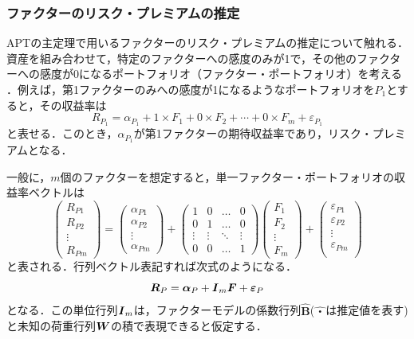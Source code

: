 ﻿\documentclass[a4paper]{jarticle}
\begin{document}
\subsubsection{ファクターのリスク・プレミアムの推定}
APTの主定理で用いるファクターのリスク・プレミアムの推定について触れる．
資産を組み合わせて，特定のファクターへの感度のみが1で，その他のファクターへの感度が0になるポートフォリオ（ファクター・ポートフォリオ）を考える ．例えば，第1ファクターのみへの感度が1になるようなポートフォリオを$P_1$とすると，その収益率は
\begin{equation}
R_{P_1} = \alpha_{P_1} + 1\times F_1 + 0\times F_2 + \cdots + 0\times F_m + \varepsilon_{P_1} 
\end{equation}
と表せる．このとき，$\alpha_{P_1}$が第1ファクターの期待収益率であり，リスク・プレミアムとなる．

一般に，$m$個のファクターを想定すると，単一ファクター・ポートフォリオの収益率ベクトルは
\begin{equation}
\left(
	\begin{array}{cccc}
	R_{P1}\\
	R_{P2}\\
	\vdots \\
	R_{Pm}
	\end{array}
\right)
=
\left(
	\begin{array}{cccc}
	\alpha_{P1}\\
	\alpha_{P2}\\
	\vdots \\
	\alpha_{Pm}
	\end{array}
\right)
+
\left(
	\begin{array}{cccc}
	1 & 0 & \ldots & 0\\
	0 & 1 & \ldots & 0\\
	\vdots & \vdots & \ddots & \vdots \\
	0 & 0 & \ldots & 1
	\end{array}
\right)
\left(
	\begin{array}{cccc}
	F_1 \\
	F_2 \\
	\vdots \\
	F_m
	\end{array}
\right)
+
\left(
	\begin{array}{cccc}
	\varepsilon_{P1}\\
	\varepsilon_{P2}\\
	\vdots \\
	\varepsilon_{Pm}\\
	\end{array}
\right)
\end{equation}
と表される．行列ベクトル表記すれば次式のようになる．
\begin{equation}
\mbox{\boldmath $R$}_P = \mbox{\boldmath $\alpha$}_P + \mbox{\boldmath $I$}_m\mbox{\boldmath $F$} + \mbox{\boldmath $\varepsilon$}_P
\end{equation}
となる．この単位行列$\mbox{\boldmath $I$}_m$は，ファクターモデルの係数行列$\hat{\bm{B}}$($\hat{・}$は推定値を表す)と未知の荷重行列$\mbox{\boldmath $W$}$の積で表現できると仮定する．
\end{document}

